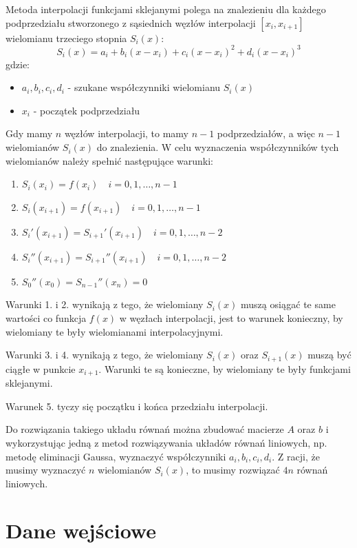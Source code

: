 \documentclass{article}
\begin{document}
Metoda interpolacji funkcjami sklejanymi polega na znalezieniu dla każdego
podprzedziału stworzonego z sąsiednich węzłów
interpolacji $[x_i, x_{i+1}]$ wielomianu trzeciego stopnia $S_i(x)$:
\begin{equation}
    S_i(x) = a_i + b_i(x - x_i) + c_i(x - x_i)^2 + d_i(x - x_i)^3
\end{equation}
gdzie:
\begin{itemize}
    \item $a_i, b_i, c_i, d_i$ - szukane współczynniki wielomianu $S_i(x)$
    \item $x_i$ - początek podprzedziału
\end{itemize}

Gdy mamy $n$ węzłów interpolacji, to mamy $n-1$ podprzedziałów, a więc $n-1$ wielomianów $S_i(x)$
do znalezienia. W celu wyznaczenia współczynników tych wielomianów należy spełnić następujące warunki:
\begin{enumerate}
    \item $S_i(x_i) = f(x_i) \quad  i = 0, 1, \dots, n-1$
    \item $S_i(x_{i+1}) = f(x_{i+1}) \quad  i = 0, 1, \dots, n-1$
    \item $S_i'(x_{i+1}) = S_{i+1}'(x_{i+1}) \quad  i = 0, 1, \dots, n-2$
    \item $S_i''(x_{i+1}) = S_{i+1}''(x_{i+1}) \quad  i = 0, 1, \dots, n-2$
    \item $S_0''(x_0) = S_{n-1}''(x_n) = 0$
\end{enumerate}

Warunki 1. i 2. wynikają z tego, że wielomiany $S_i(x)$ muszą osiągać te same wartości co funkcja $f(x)$ 
w węzłach interpolacji, jest to warunek konieczny, 
by wielomiany te były wielomianami interpolacyjnymi.

Warunki 3. i 4. wynikają z tego, że wielomiany $S_i(x)$ oraz $S_{i+1}(x)$ muszą być ciągłe 
w punkcie $x_{i+1}$. Warunki te są konieczne, by wielomiany te były funkcjami sklejanymi.

Warunek 5. tyczy się początku i końca przedziału interpolacji.

Do rozwiązania takiego układu równań można zbudować macierze $A$ oraz $b$ i wykorzystując
jedną z metod rozwiązywania układów równań liniowych, np. metodę eliminacji Gaussa, wyznaczyć
współczynniki $a_i, b_i, c_i, d_i$. Z racji, że musimy wyznaczyć $n$ wielomianów $S_i(x)$,
to musimy rozwiązać $4n$ równań liniowych.

\newpage

\section{Dane wejściowe}
\end{document}
